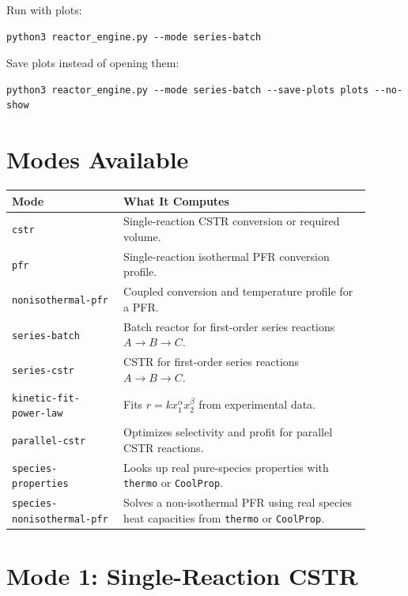 \documentclass[11pt]{article}
\begin{document}
Run with plots:

\begin{lstlisting}
python3 reactor_engine.py --mode series-batch
\end{lstlisting}

Save plots instead of opening them:

\begin{lstlisting}
python3 reactor_engine.py --mode series-batch --save-plots plots --no-show
\end{lstlisting}

\section{Modes Available}

\begin{center}
\begin{tabular}{p{0.28\linewidth} p{0.62\linewidth}}
\toprule
\textbf{Mode} & \textbf{What It Computes} \\
\midrule
\texttt{cstr} & Single-reaction CSTR conversion or required volume. \\
\texttt{pfr} & Single-reaction isothermal PFR conversion profile. \\
\texttt{nonisothermal-pfr} & Coupled conversion and temperature profile for a PFR. \\
\texttt{series-batch} & Batch reactor for first-order series reactions $A \to B \to C$. \\
\texttt{series-cstr} & CSTR for first-order series reactions $A \to B \to C$. \\
\texttt{kinetic-fit-power-law} & Fits $r = kx_1^\alpha x_2^\beta$ from experimental data. \\
\texttt{parallel-cstr} & Optimizes selectivity and profit for parallel CSTR reactions. \\
\texttt{species-properties} & Looks up real pure-species properties with \texttt{thermo} or \texttt{CoolProp}. \\
\texttt{species-nonisothermal-pfr} & Solves a non-isothermal PFR using real species heat capacities from \texttt{thermo} or \texttt{CoolProp}. \\
\bottomrule
\end{tabular}
\end{center}

\section{Mode 1: Single-Reaction CSTR}
\end{document}
